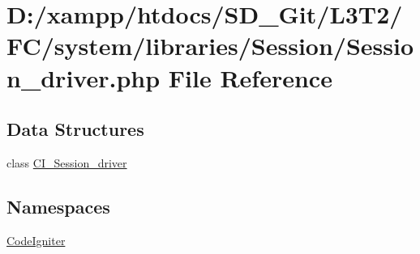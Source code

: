 \hypertarget{system_2libraries_2_session_2_session__driver_8php}{}\section{D\+:/xampp/htdocs/\+S\+D\+\_\+\+Git/\+L3\+T2/\+F\+C/system/libraries/\+Session/\+Session\+\_\+driver.php File Reference}
\label{system_2libraries_2_session_2_session__driver_8php}
\subsection*{Data Structures}
\begin{DoxyCompactItemize}
\item 
class \hyperlink{class_c_i___session__driver}{C\+I\+\_\+\+Session\+\_\+driver}
\end{DoxyCompactItemize}
\subsection*{Namespaces}
\begin{DoxyCompactItemize}
\item 
 \hyperlink{namespace_code_igniter}{Code\+Igniter}
\end{DoxyCompactItemize}
